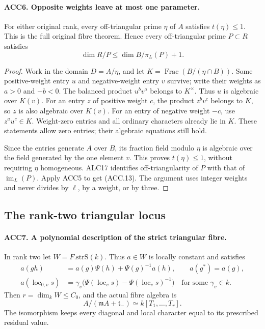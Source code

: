 \documentclass[11pt,a4paper]{article}
\numberwithin{equation}{section}
\theoremstyle{remark}\newtheorem{remark}[theorem]{Remark}
\begin{document}
\paragraph{ACC6. Opposite weights leave at most one parameter.}
\label{claim:ACC6}
For either original rank, every off-triangular prime \(\eta\) of
\(A\) satisfies \(t(\eta)\le1\).  This is the full original
\(\mathrm{fibre}\) theorem.  Hence every off-triangular prime
\(P\subset R\) satisfies
\[
                         \dim R/P\le\dim B/\pi_L(P)+1.
                                                               \tag{ACC.13}
\]

\begin{proof}
Work in the domain \(D=A/\eta\), and let
\(K=\operatorname{Frac}(B/(\eta\cap B))\).  Some positive-weight
entry \(u\) and negative-weight entry \(v\) survive; write their
weights as \(a>0\) and \(-b<0\).  The balanced product
\(u^b v^a\) belongs to \(K^\times\).  Thus \(u\) is algebraic
over \(K(v)\).  For an entry \(z\) of positive weight \(c\),
the product \(z^b v^c\) belongs to \(K\), so \(z\) is also
algebraic over \(K(v)\).  For an entry of negative weight
\(-c\), use \(z^a u^c\in K\).  Weight-zero entries and all
ordinary characters already lie in \(K\).  These statements allow
zero entries; their algebraic equations still hold.

Since the entries generate \(A\) over \(B\), its fraction field
modulo \(\eta\) is algebraic over the field generated by the one
element \(v\).  This proves \(t(\eta)\le1\), without requiring
\(\eta\) homogeneous.  ALC17 identifies off-triangularity of
\(P\) with that of \(\operatorname{im}_L(P)\).  Apply ACC5
to get (ACC.13).  The argument uses integer weights and never
divides by \(\ell\), by a weight, or by three.
\end{proof}

\subsection{The rank-two triangular locus}

\paragraph{ACC7. A polynomial description of the strict triangular fibre.}
\label{claim:ACC7}
In rank two let \(W=F.\mathrm{strS}(k)\).  Thus \(a\in W\)
is locally constant and satisfies
\[
 \begin{split}
 a(gh)&=a(g)\Psi(h)+\Psi(g)^{-1}a(h),\qquad a(g^*)=a(g),\\
 a(\operatorname{loc}_{0,v}s)
   &=\gamma_v\bigl(\Psi(\operatorname{loc}_v s)
                         -\Psi(\operatorname{loc}_v s)^{-1}\bigr)
                    \quad\text{for some }\gamma_v\in k.
 \end{split}                                                \tag{ACC.14}
\]
Then \(r=\dim_k W\le C_0\), and the actual fibre algebra is
\[
                   A/(\mathfrak m A+\mathfrak t_-)
                       \simeq k[T_1,\ldots,T_r].           \tag{ACC.15}
\]
The isomorphism keeps every diagonal and local character equal to
its prescribed residual value.
\end{document}
